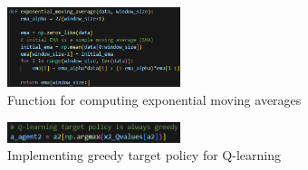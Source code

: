 \documentclass[conference]{IEEEtran}
\begin{document}
\begin{figure}[htbp]
\centerline{\includegraphics[width=0.45\textwidth]{images/ema.png}}
\caption{Function for computing exponential moving averages}
\label{fig:exponential_moving_average}
\end{figure}

\begin{figure}[htbp]
\centerline{\includegraphics[width=0.45\textwidth]{images/target_policy_qlearning.png}}
\caption{Implementing greedy target policy for Q-learning}
\label{fig:target_policy_qlearning}
\end{figure}
\end{document}

